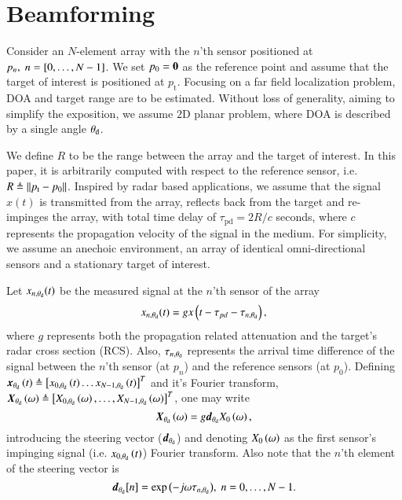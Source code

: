 \section{Beamforming}\label{sec:setup}
Consider an $N$-element array with the $n$'th sensor positioned at $p_{n},\; n=\left[{0,\ldots,N-1}\right]$. We set $p_{0}=\boldsymbol{0}$ as the reference point and assume that the target of interest is positioned at $p_{\text{t}}$.
Focusing on a far field localization problem, DOA and target range are to be estimated. Without loss of generality, aiming to simplify the exposition, we assume $2\text{D}$ planar problem, where DOA is described by a single angle $\theta_{\text{d}}$. 
\par We define $R$ to be the range between the array and the target of interest. In this paper, it is arbitrarily computed with respect to the reference sensor, i.e. $R\triangleq\left\Vert p_{\text{t}}-p_{0}\right\Vert$.
Inspired by radar based applications, we assume that the signal $x(t)$ is transmitted from the array, reflects back from the target and re-impinges the array, with total time delay of $\tau_{\text{pd}}=2R/c$ seconds, where $c$ represents the propagation velocity of the signal in the medium. 
For simplicity, we assume an anechoic environment, an array of identical omni-directional sensors and a stationary target of interest.
\par Let $x_{n,\theta_{\text{d}}}(t)$ be the measured signal at the $n$'th sensor of the array
\begin{equation}
x_{n,\thetaD}(t) = gx\Brack{t-\tau_{pd}-\tau_{n,\thetaD}},
\label{eqn:noFeedbackULA_singleSensor_temporal}
\end{equation}
where $g$ represents both the propagation related attenuation and the target's radar cross section (RCS). 
Also, $\tau_{n,\theta_{\text{d}}}$ represents the arrival time difference of the signal between the $n$'th sensor (at $p_{n}$) and the reference sensors (at $p_{0}$). 
Defining $\boldsymbol{x}_{\theta_{\text{d}}}\left({t}\right)\triangleq\left[{x_{0,\theta_{\text{d}}}\left({t}\right)\hdots{}x_{N-1,\theta_{\text{d}}}\left({t}\right)}\right]^{T}$ and it's Fourier transform, $\vecnot{\F{x}}_{\thetaD}\rBrace{\omega}\triangleq\vBrace{X_{0,\thetaD}\rBrace{\omega},\hdots,X_{N-1,\thetaD}\rBrace{\omega}}^{T}$, one may write 
\[
\vecnot{\F{x}}_{\thetaD}\rBrace{\omega}=g\Steer{\thetaD}\F{x}_{0}\rBrace{\omega},
\]
introducing the steering vector ($\boldsymbol{d}_{\theta_{\text{d}}}$) and denoting $\F{x}_{0}\rBrace{\omega}$ as the first sensor's impinging signal (i.e. $x_{0,\theta_{\text{d}}}\left({t}\right)$) Fourier transform. Also note that the $n$'th element of the steering vector is
\begin{equation}
    \label{eq:d}
    \vd_{\thetaD}[n] = \exp{\rBrace{-j\omega\tau_{n,\thetaD}}},\;n=0,\ldots,N-1.
\end{equation}
